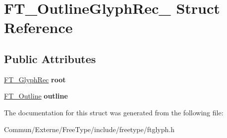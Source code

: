 \hypertarget{struct_f_t___outline_glyph_rec__}{}\section{F\+T\+\_\+\+Outline\+Glyph\+Rec\+\_\+ Struct Reference}
\label{struct_f_t___outline_glyph_rec__}
\subsection*{Public Attributes}
\begin{DoxyCompactItemize}
\item 
\hyperlink{struct_f_t___glyph_rec__}{F\+T\+\_\+\+Glyph\+Rec} {\bfseries root}\hypertarget{struct_f_t___outline_glyph_rec___a71e5a8d5fe69e0cea68c96486dd6713f}{}\label{struct_f_t___outline_glyph_rec___a71e5a8d5fe69e0cea68c96486dd6713f}

\item 
\hyperlink{struct_f_t___outline__}{F\+T\+\_\+\+Outline} {\bfseries outline}\hypertarget{struct_f_t___outline_glyph_rec___af1bd473a32fcbc500edcfcf89e3ac8ac}{}\label{struct_f_t___outline_glyph_rec___af1bd473a32fcbc500edcfcf89e3ac8ac}

\end{DoxyCompactItemize}


The documentation for this struct was generated from the following file\+:\begin{DoxyCompactItemize}
\item 
Commun/\+Externe/\+Free\+Type/include/freetype/ftglyph.\+h\end{DoxyCompactItemize}
